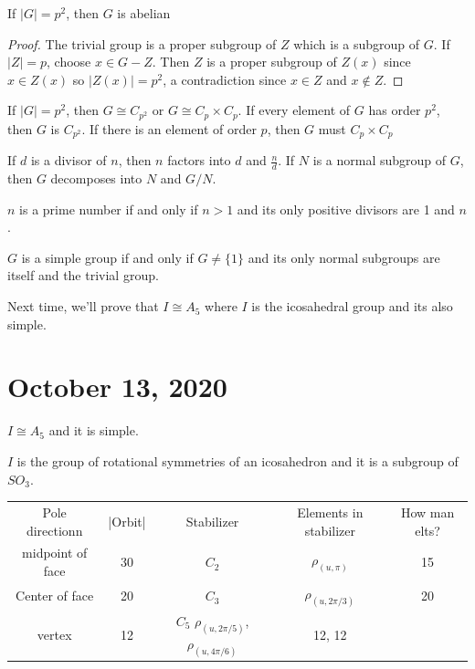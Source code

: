 \documentclass{article}
\begin{document}
\begin{proposition}
If $|G|=p^2$, then $G$ is abelian
\end{proposition}
\begin{proof}
The trivial group is a proper subgroup of $Z$ which is a subgroup of $G$. If $|Z|=p$, choose $x\in G-Z$. Then $Z$ is a proper subgroup of $Z(x)$ since $x\in Z(x)$ so $|Z(x)|=p^2$, a contradiction since $x\in Z$ and $x\notin Z$.
\end{proof}
\begin{proposition}
If $|G|=p^2$, then $G\cong C_{p^2}$ or $G\cong C_p\times C_p$.
If every element of $G$ has order $p^2$, then $G$ is $C_{p^2}$. If there is an element of order $p$, then $G$ must $C_p\times C_p$
\end{proposition}
If $d$ is a divisor of $n$, then $n$ factors into $d$ and $\frac{n}{d}$. If $N$ is a normal subgroup of $G$, then $G$ decomposes into $N$ and $G/N$.
\begin{definition}
$n$ is a prime number if and only if $n>1$ and its only positive divisors are 1 and $n$.
\end{definition}
\begin{definition}
$G$ is a simple group if and only if $G\neq\{1\}$ and its only normal subgroups are itself and the trivial group.
\end{definition}
Next time, we'll prove that $I\cong A_5$ where $I$ is the icosahedral group and its also simple.
\section{October 13, 2020}
\begin{theorem}
$I\cong A_5$ and it is simple.
\end{theorem}
$I$ is the group of rotational symmetries of an icosahedron and it is a subgroup of $SO_3$.

\begin{tabular}{c|c|c|c|c}
    Pole directionn &  |Orbit| & Stabilizer & Elements in stabilizer & How man elts?\\
    midpoint of face & 30 & $C_2$ &$\rho_{(u,\pi)}$ & 15\\
    Center of face & 20 & $C_3$ & $\rho_{(u,2\pi/3)}$ & 20\\
    vertex & 12 & $C_5$ $\rho_{(u,2\pi/5)}$, $\rho_{(u,4\pi/6)}$ & 12, 12
\end{tabular}
\end{document}

